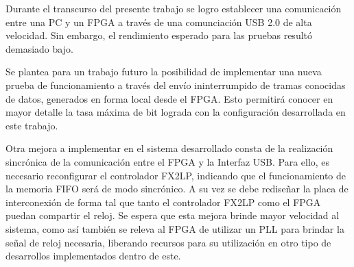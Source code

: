 Durante el transcurso del presente trabajo se logro establecer una comunicación entre una PC y un FPGA a través de una comunciación USB 2.0 de alta velocidad. Sin embargo, el rendimiento esperado para las pruebas resultó demasiado bajo.

Se plantea para un trabajo futuro la posibilidad de implementar una nueva prueba de funcionamiento a través del envío ininterrumpido de tramas conocidas de datos, generados en forma local desde el FPGA. Esto permitirá conocer en mayor detalle la tasa máxima de bit lograda con la configuración desarrollada en este trabajo.

Otra mejora a implementar en el sistema desarrollado consta de la realización sincrónica de la comunicación entre el FPGA y la Interfaz USB. Para ello, es necesario reconfigurar el controlador FX2LP, indicando que el funcionamiento de la memoria FIFO será de modo sincrónico. A su vez se debe rediseñar la placa de interconexión de forma tal que tanto el controlador FX2LP como el FPGA puedan compartir el reloj. Se espera que esta mejora brinde mayor velocidad al sistema, como así también se releva al FPGA de utilizar un PLL para brindar la señal de reloj necesaria, liberando recursos para su utilización en otro tipo de desarrollos implementados dentro de este.